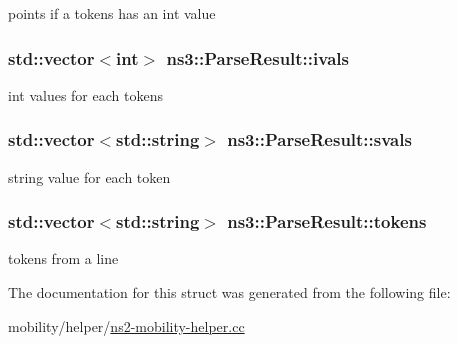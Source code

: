 points if a tokens has an int value 

\subsubsection[{\texorpdfstring{ivals}{ivals}}]{\setlength{\rightskip}{0pt plus 5cm}std\+::vector$<$int$>$ ns3\+::\+Parse\+Result\+::ivals}\hypertarget{structns3_1_1ParseResult_a91584286bc7cb7bb4b0084090228d341}{}\label{structns3_1_1ParseResult_a91584286bc7cb7bb4b0084090228d341}


int values for each tokens 

\subsubsection[{\texorpdfstring{svals}{svals}}]{\setlength{\rightskip}{0pt plus 5cm}std\+::vector$<$std\+::string$>$ ns3\+::\+Parse\+Result\+::svals}\hypertarget{structns3_1_1ParseResult_a5b09d2266fc867d306029482ef583d17}{}\label{structns3_1_1ParseResult_a5b09d2266fc867d306029482ef583d17}


string value for each token 

\subsubsection[{\texorpdfstring{tokens}{tokens}}]{\setlength{\rightskip}{0pt plus 5cm}std\+::vector$<$std\+::string$>$ ns3\+::\+Parse\+Result\+::tokens}\hypertarget{structns3_1_1ParseResult_a5b229ec9d2b9721f7bab7186b2701f0d}{}\label{structns3_1_1ParseResult_a5b229ec9d2b9721f7bab7186b2701f0d}


tokens from a line 



The documentation for this struct was generated from the following file\+:\begin{DoxyCompactItemize}
\item 
mobility/helper/\hyperlink{ns2-mobility-helper_8cc}{ns2-\/mobility-\/helper.\+cc}\end{DoxyCompactItemize}

